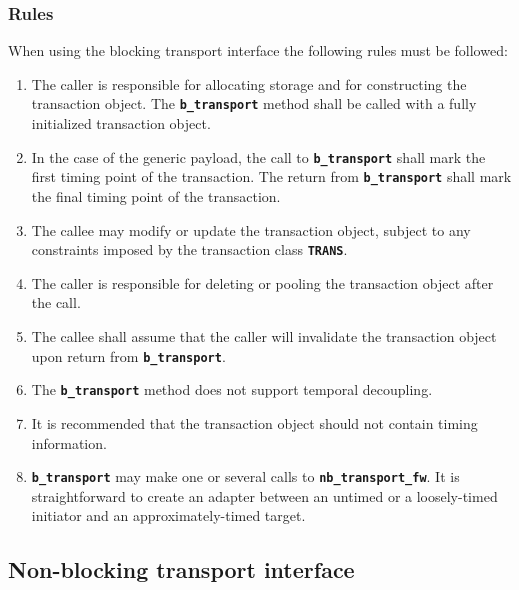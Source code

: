 {\subsubsection{Rules}
When using the blocking transport interface the following rules must be followed:
\begin{enumerate}
	\item The caller is responsible for allocating storage and for constructing the transaction object. 
	The \texttt{\textbf{b\_transport}} method shall be called with a fully initialized transaction object.
	\item In the case of the generic payload, the call to \texttt{\textbf{b\_transport}} shall mark the first timing point of the transaction.
	The return from \texttt{\textbf{b\_transport}} shall mark the final timing point of the transaction.
	\item The callee may modify or update the transaction object, subject to any constraints imposed by the transaction class \texttt{\textbf{TRANS}}.
	\item The caller is responsible for deleting or pooling the transaction object after the call.
	\item The callee shall assume that the caller will invalidate the transaction object upon return from \texttt{\textbf{b\_transport}}.
	\item The \texttt{\textbf{b\_transport}} method does not support temporal decoupling.
	\item It is recommended that the transaction object should not contain timing information. 
	\item \texttt{\textbf{b\_transport}} may make one or several calls to \texttt{\textbf{nb\_transport\_fw}}. 
	It is straightforward to create an adapter between an untimed or a loosely-timed initiator and an approximately-timed target.
\end{enumerate}
}

\subsection{Non-blocking transport interface}

